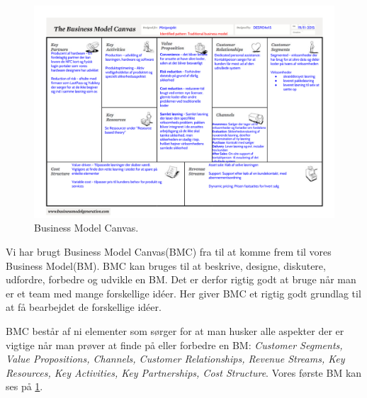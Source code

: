 \begin{figure}
  \includegraphics[angle=90, height=0.95\textheight]{graphics/BM.pdf}
  \caption{Business Model Canvas.}
  \label{bm}
\end{figure}

Vi har brugt Business Model Canvas(BMC) fra \citet{osterwalder2009business} til at komme frem til vores Business Model(BM).
BMC kan bruges til at beskrive, designe, diskutere, udfordre, forbedre og udvikle en BM.
Det er derfor rigtig godt at bruge når man er et team med mange forskellige idéer.
Her giver BMC et rigtig godt grundlag til at få bearbejdet de forskellige idéer.


BMC består af ni elementer som sørger for at man husker alle aspekter der er vigtige når man prøver at finde på eller forbedre en BM: \textit{Customer Segments, Value Propositions, Channels, Customer Relationships, Revenue Streams, Key Resources, Key Activities, Key Partnerships, Cost Structure}.
Vores første BM kan ses på \cref{bm}.
